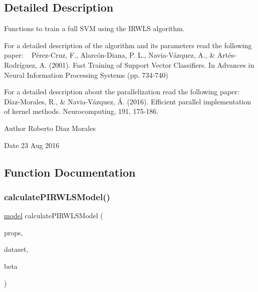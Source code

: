 \subsection{Detailed Description}
Functions to train a full S\+VM using the I\+R\+W\+LS algorithm. 

For a detailed description of the algorithm and its parameters read the following paper\+: ~\newline
 Pérez-\/\+Cruz, F., Alarcón-\/\+Diana, P. L., Navia-\/\+Vázquez, A., \& Artés-\/\+Rodríguez, A. (2001). Fast Training of Support Vector Classifiers. In Advances in Neural Information Processing Systems (pp. 734-\/740)

For a detailed description about the parallelization read the following paper\+: ~\newline
Díaz-\/\+Morales, R., \& Navia-\/\+Vázquez, Á. (2016). Efficient parallel implementation of kernel methods. Neurocomputing, 191, 175-\/186.

\begin{DoxyAuthor}{Author}
Roberto Diaz Morales 
\end{DoxyAuthor}
\begin{DoxyDate}{Date}
23 Aug 2016 
\end{DoxyDate}


\subsection{Function Documentation}
\hypertarget{PIRWLS-train_8h_aeaa2f3c1d0f757826017dae7a83d7f8a}{}\label{PIRWLS-train_8h_aeaa2f3c1d0f757826017dae7a83d7f8a} 
\subsubsection{\texorpdfstring{calculate\+P\+I\+R\+W\+L\+S\+Model()}{calculatePIRWLSModel()}}
{\ttfamily \hyperlink{structmodel}{model} calculate\+P\+I\+R\+W\+L\+S\+Model (\begin{DoxyParamCaption}\item[{\hyperlink{structproperties}{properties}}]{props,  }\item[{\hyperlink{structsvm__dataset}{svm\+\_\+dataset}}]{dataset,  }\item[{double $\ast$}]{beta }\end{DoxyParamCaption})}



